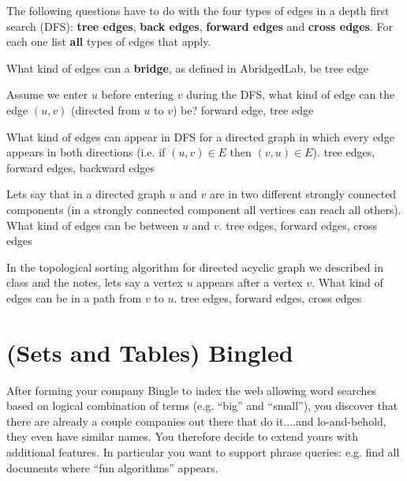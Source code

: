 \begin{problem}
%

The following questions have to do with the four types of edges in
a depth first search (DFS): \textbf{tree edges}, \textbf{back edges},
\textbf{forward edges} and \textbf{cross edges}.  For each one list
\textbf{all} types of edges that apply.


\ask[3.]
What kind of edges can a \textbf{bridge}, as defined in AbridgedLab, be
\sol
tree edge

\ask[3.]
Assume we enter $u$ before entering $v$ during the DFS, what kind of
edge can the edge $(u,v)$ (directed from $u$ to $v$) be?
\sol
forward edge, tree edge


\ask[3.]
What kind of edges can appear in DFS for a directed graph in which
every edge appears in both directions (i.e. if $(u,v) \in E$ then $(v,u)
\in E$).
\sol
tree edges, forward edges, backward edges


\ask[3.] Lets say that in a directed graph $u$ and $v$ are in two
different strongly connected components (in a strongly connected
component all vertices can reach all others).  What kind of edges can
be between $u$ and $v$.
\sol
tree edges, forward edges, cross edges

\ask[3.]
In the topological sorting algorithm for directed acyclic graph we
described in class and the notes, lets say a vertex $u$ appears
after a vertex $v$.  What kind of edges can be in a path
from $v$ to $u$.
\sol
tree edges, forward edges, cross edges

\end{problem}



\section{(Sets and Tables) Bingled}


%

After forming your company Bingle to index the web allowing word
searches based on logical combination of terms (e.g. ``big'' and
``small''), you discover that there are already a couple companies out
there that do it....and lo-and-behold, they even have similar names.
You therefore decide to extend yours with additional features.  In
particular you want to support phrase queries: e.g. find all
documents where ``fun algorithms'' appears.

